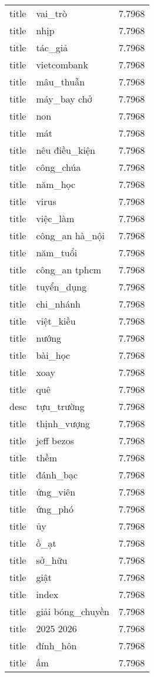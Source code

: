 \documentclass{article}
\begin{document}
\begin{tabular}{lll}
title & vai\_trò & 7.7968\\
title & nhịp & 7.7968\\
title & tác\_giả & 7.7968\\
title & vietcombank & 7.7968\\
title & mâu\_thuẫn & 7.7968\\
title & máy\_bay chở & 7.7968\\
title & non & 7.7968\\
title & mát & 7.7968\\
title & nêu điều\_kiện & 7.7968\\
title & công\_chúa & 7.7968\\
title & năm\_học & 7.7968\\
title & virus & 7.7968\\
title & việc\_làm & 7.7968\\
title & công\_an hà\_nội & 7.7968\\
title & năm\_tuổi & 7.7968\\
title & công\_an tphcm & 7.7968\\
title & tuyển\_dụng & 7.7968\\
title & chi\_nhánh & 7.7968\\
title & việt\_kiều & 7.7968\\
title & nướng & 7.7968\\
title & bài\_học & 7.7968\\
title & xoay & 7.7968\\
title & quê & 7.7968\\
desc & tựu\_trường & 7.7968\\
title & thịnh\_vượng & 7.7968\\
title & jeff bezos & 7.7968\\
title & thềm & 7.7968\\
title & đánh\_bạc & 7.7968\\
title & ứng\_viên & 7.7968\\
title & ứng\_phó & 7.7968\\
title & ủy & 7.7968\\
title & ồ\_ạt & 7.7968\\
title & sở\_hữu & 7.7968\\
title & giật & 7.7968\\
title & index & 7.7968\\
title & giải bóng\_chuyền & 7.7968\\
title & 2025 2026 & 7.7968\\
title & đính\_hôn & 7.7968\\
title & ấm & 7.7968\\

\end{tabular}
\end{document}
